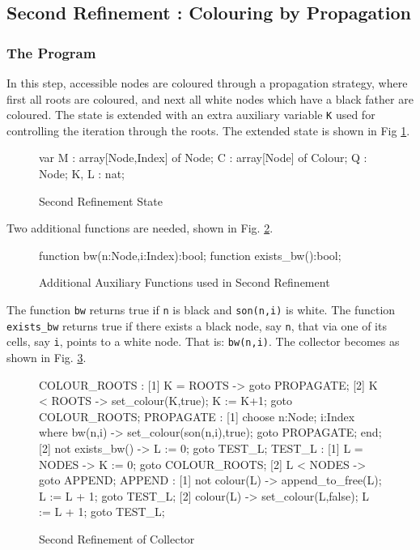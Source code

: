 \subsection{Second Refinement : Colouring by Propagation}
\label{second-refinement}

\subsubsection{The Program}

In this  step,  accessible nodes  are  coloured  through a propagation
strategy, where first all roots are coloured, and next all white nodes
which have a black father are coloured.  The state is extended with an
extra auxiliary variable {\tt K}  used for controlling the  iteration
through  the  roots.   The   extended    state is shown  in Fig \ref{refinement2-state}.

\begin{figure}[htb]
\begin{smallsession}
  var
    M : array[Node,Index] of Node;
    C : array[Node] of Colour;
    Q : Node;
    K, L : nat;
\end{smallsession}
\caption{Second Refinement State}
\label{refinement2-state}
\end{figure}

\noindent Two  additional    functions are needed, shown in Fig. 
\ref{refinement2-functions}.

\begin{figure}[htb]
\begin{smallsession}
  function bw(n:Node,i:Index):bool;
  function exists_bw():bool;
\end{smallsession}
\caption{Additional Auxiliary Functions used in Second Refinement}
\label{refinement2-functions}
\end{figure}

The function {\tt bw} returns true if {\tt n} is black and {\tt son(n,i)}
is white. The function {\tt exists\_bw} returns true if there exists a
black node,  say {\tt n},  that  via one of  its cells,  say {\tt i},
points to a white node. That is: {\tt bw(n,i)}\@. The collector becomes as
shown in Fig. \ref{refinement2-collector}.

\begin{figure}[htb]
\begin{smallsession}
  COLOUR_ROOTS :
    [1] K = ROOTS -> goto PROPAGATE;
    [2] K < ROOTS -> set_colour(K,true); K := K+1; goto COLOUR_ROOTS;
  PROPAGATE :
    [1] choose n:Node; i:Index where bw(n,i) -> 
          set_colour(son(n,i),true); 
          goto PROPAGATE;
        end;
    [2] not exists_bw() -> L := 0; goto TEST_L;
  TEST_L :
    [1] L = NODES -> K := 0; goto COLOUR_ROOTS;
    [2] L < NODES -> goto APPEND;
  APPEND :
    [1] not colour(L) -> append_to_free(L); L := L + 1; goto TEST_L;
    [2] colour(L) -> set_colour(L,false); L := L + 1; goto TEST_L; 
\end{smallsession}
\caption{Second Refinement of Collector}
\label{refinement2-collector}
\end{figure}

